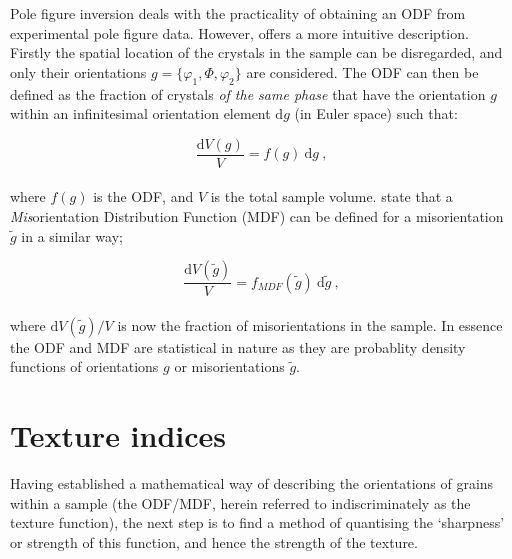 \documentclass[a4paper,12pt,twoside]{report}
\numberwithin{equation}{chapter}
\begin{document}

Pole figure inversion deals with the practicality of obtaining an ODF from experimental pole figure data. However, \cite{bunge1982texture} offers a more intuitive description. Firstly the spatial location of the crystals in the sample can be disregarded, and only their orientations $g = \{\varphi_1,\Phi,\varphi_2\}$ are considered. The ODF can then be defined as the fraction of crystals \emph{of the same phase} that have the orientation $g$ within an infinitesimal orientation element $\mathrm{d}g$ (in Euler space) such that: 



\begin{equation}
\frac{\mathrm{d}V(g)}{V} = f(g)\ \mathrm{d}g\ ,
\end{equation}
\\
where $f(g)$ is the ODF, and $V$ is the total sample volume. \cite{Mainprice} state that a \emph{Mis}orientation Distribution Function (MDF) can be defined for a misorientation $\tilde{g}$ in a similar way;




\begin{equation}
\frac{\mathrm{d}V(\tilde{g})}{V} = f_{MDF}(\tilde{g})\ \mathrm{d}\tilde{g}\ ,
\end{equation}
\\
where $\mathrm{d}V(\tilde{g})/V$ is now the fraction of misorientations in the sample. In essence the ODF and MDF are statistical in nature as they are probablity density functions of orientations $g$ or misorientations $\tilde{g}$. 


\section{Texture indices} \label{sec:indicies}
Having established a mathematical way of describing the orientations of grains within a sample (the ODF/MDF, herein referred to indiscriminately as the texture function), the next step is to find a method of quantising the \lq{}sharpness\rq{} or strength of this function, and hence the strength of the texture.
\end{document}
